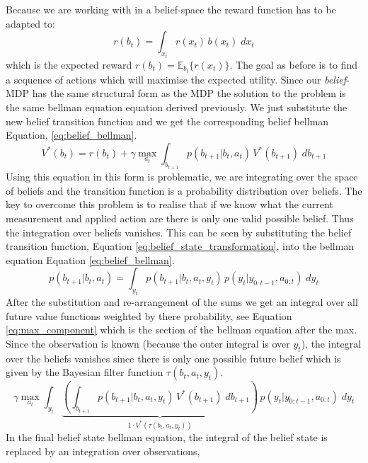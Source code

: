 Because we are working with in a belief-space the reward function has to be adapted to:
\begin{equation}
  r(b_t) = \int_{x_t} r(x_t)\, b(x_t)\;dx_t
\end{equation}
which is the expected reward $r(b_t) = \mathbb{E}_{b_t}\{r(x_t)\}$. The goal as before is to find a sequence of actions 
which will maximise the expected utility. Since our \textit{belief}-MDP has the same structural form as the MDP the solution 
to the problem is the same bellman equation equation derived previously. We just substitute the new belief transition function 
and we get the corresponding belief bellman Equation, \ref{eq:belief_bellman}.
\begin{equation}\label{eq:belief_bellman}
 V^*(b_t) = r(b_t) + \gamma \max_{a_t} \int_{b_{t+1}} p(b_{t+1}|b_t,a_t)\,V^*(b_{t+1})\;db_{t+1}
\end{equation}
Using this equation in this form is problematic, we are integrating over the space of beliefs and the 
transition function is a probability distribution over beliefs. The key to overcome this problem is to 
realise that if we know what the current measurement and applied action are there is only one valid possible belief.
Thus the integration over beliefs vanishes. This can be seen by substituting the belief transition function,
Equation \ref{eq:belief_state_transformation}, into the bellman equation Equation \ref{eq:belief_bellman}.
\begin{equation}\label{eq:belief_state_transformation}
 p(b_{t+1}|b_t,a_t) = \int_{y_t} p(b_{t+1}|b_t,a_t,y_t)\,p(y_t|y_{0:t-1},a_{0:t})\; dy_t
\end{equation}
After the substitution and re-arrangement of the sums we get an integral over all future value 
functions weighted by there probability, see Equation \ref{eq:max_component} which is the section of the bellman equation 
after the max. Since the observation is known (because the outer integral is over $y_t$),
the integral over the beliefs vanishes since there is only one possible future belief which is given by the 
Bayesian filter function $\tau(b_t,a_t,y_t)$.
\begin{equation}\label{eq:max_component}
 \gamma \max_{a_t} \int_{y_t} \underbrace{\left( \int_{b_{t+1}} p(b_{t+1}|b_t,a_t,y_t)\,V^*(b_{t+1})\; db_{t+1}\right)}_{1 \cdot V^*(\tau(b_t,a_t,y_t))}\, p(y_t|y_{0:t-1},a_{0:t}) \; dy_t
\end{equation}
In the final belief state bellman equation, the integral of the belief state is replaced by an integration over observations,
